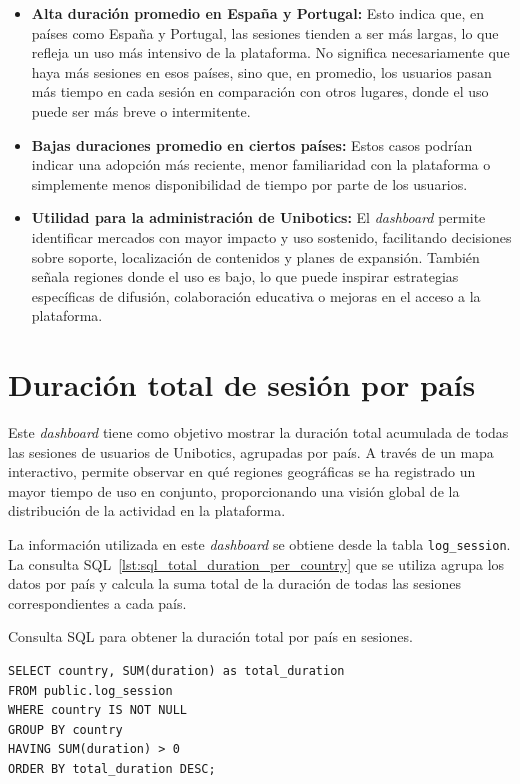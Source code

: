 \documentclass[a4paper, 12pt]{book}
\begin{document}
\begin{itemize}
  \item \textbf{Alta duración promedio en España y Portugal:} Esto indica que, en países como España y Portugal, las sesiones tienden a ser más largas, lo que refleja un uso más intensivo de la plataforma. No significa necesariamente que haya más sesiones en esos países, sino que, en promedio, los usuarios pasan más tiempo en cada sesión en comparación con otros lugares, donde el uso puede ser más breve o intermitente.

  \item \textbf{Bajas duraciones promedio en ciertos países:} Estos casos podrían indicar una adopción más reciente, menor familiaridad con la plataforma o simplemente menos disponibilidad de tiempo por parte de los usuarios.

  \item \textbf{Utilidad para la administración de Unibotics:} El \textit{dashboard} permite identificar mercados con mayor impacto y uso sostenido, facilitando decisiones sobre soporte, localización de contenidos y planes de expansión. También señala regiones donde el uso es bajo, lo que puede inspirar estrategias específicas de difusión, colaboración educativa o mejoras en el acceso a la plataforma.
\end{itemize}

\section{Duración total de sesión por país}
\label{sec:dash2a}

Este \textit{dashboard} tiene como objetivo mostrar la duración total acumulada de todas las sesiones de usuarios de Unibotics, agrupadas por país. A través de un mapa interactivo, permite observar en qué regiones geográficas se ha registrado un mayor tiempo de uso en conjunto, proporcionando una visión global de la distribución de la actividad en la plataforma.

La información utilizada en este \textit{dashboard} se obtiene desde la tabla \texttt{log\_session}. La consulta SQL~\ref{lst:sql_total_duration_per_country} que se utiliza agrupa los datos por país y calcula la suma total de la duración de todas las sesiones correspondientes a cada país.

\begin{listing}[h!]
\caption{Consulta SQL para obtener la duración total por país en sesiones.}
\label{lst:sql_total_duration_per_country}
\begin{verbatim}
SELECT country, SUM(duration) as total_duration
FROM public.log_session
WHERE country IS NOT NULL
GROUP BY country
HAVING SUM(duration) > 0
ORDER BY total_duration DESC;
\end{verbatim}
\end{listing}
\end{document}
